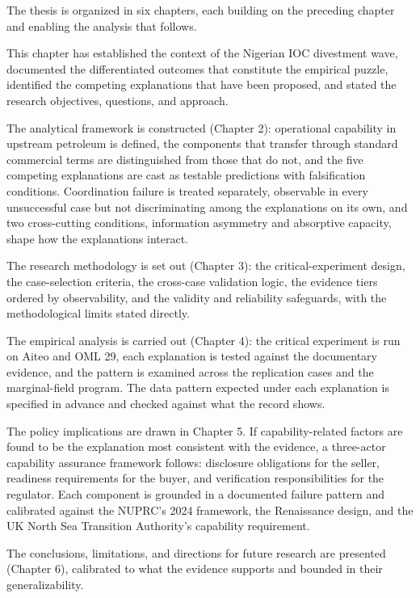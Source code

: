 \documentclass[twoside,fontset=lmodern]{mitthesis}
\begin{document}
The thesis is organized in six chapters, each building on the preceding
chapter and enabling the analysis that follows.

This chapter has established the context of the Nigerian IOC divestment
wave, documented the differentiated outcomes that constitute the
empirical puzzle, identified the competing explanations that have been
proposed, and stated the research objectives, questions, and approach.

The analytical framework is constructed (Chapter 2): operational
capability in upstream petroleum is defined, the components that
transfer through standard commercial terms are distinguished from those
that do not, and the five competing explanations are cast as testable
predictions with falsification conditions. Coordination failure is
treated separately, observable in every unsuccessful case but not
discriminating among the explanations on its own, and two cross-cutting
conditions, information asymmetry and absorptive capacity, shape how the
explanations interact.

The research methodology is set out (Chapter 3): the critical-experiment
design, the case-selection criteria, the cross-case validation logic,
the evidence tiers ordered by observability, and the validity and
reliability safeguards, with the methodological limits stated directly.

The empirical analysis is carried out (Chapter 4): the critical
experiment is run on Aiteo and OML 29, each explanation is tested
against the documentary evidence, and the pattern is examined across the
replication cases and the marginal-field program. The data pattern
expected under each explanation is specified in advance and checked
against what the record shows.

The policy implications are drawn in Chapter 5. If capability-related
factors are found to be the explanation most consistent with the
evidence, a three-actor capability assurance framework follows:
disclosure obligations for the seller, readiness requirements for the
buyer, and verification responsibilities for the regulator. Each
component is grounded in a documented failure pattern and calibrated
against the NUPRC's 2024 framework, the Renaissance design, and the UK
North Sea Transition Authority's capability requirement.

The conclusions, limitations, and directions for future research are
presented (Chapter 6), calibrated to what the evidence supports and
bounded in their generalizability.
\end{document}
